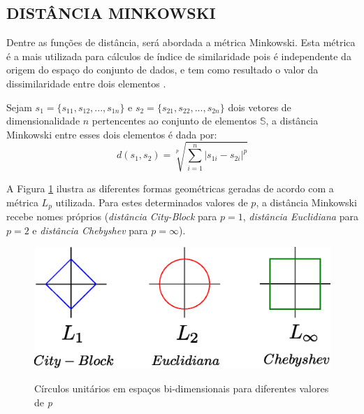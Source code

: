 \subsection{DISTÂNCIA MINKOWSKI}
Dentre as funções de distância, será abordada a métrica Minkowski. Esta métrica é a mais utilizada para cálculos de índice de similaridade
pois é independente da origem do espaço do conjunto de dados, e tem como resultado o valor da dissimilaridade entre dois elementos \cite{Jain1988}.
\begin{mydef}
\label{def:mink}
  Sejam $s_1 = \{s_{11},s_{12},...,s_{1n}\}$ e $s_2 = \{s_{21},s_{22},...,s_{2n}\}$ dois vetores de dimensionalidade $n$ pertencentes ao conjunto de
  elementos $\mathbb{S}$, a distância Minkowski entre esses dois elementos é dada por:
\begin{equation}
		d(s_1,s_2) = \sqrt[p]{\sum_{i=1}^{n}|s_{1i} - s_{2i}|^p}
\end{equation}
\end{mydef}

A Figura \ref{fig:minko} ilustra as diferentes formas geométricas geradas de acordo com a métrica $L_p$ utilizada. Para estes determinados valores de $p$, a distância Minkowski recebe nomes
próprios (\textit{distância City-Block} para $p = 1$, \textit{distância Euclidiana} para $p = 2$ e \textit{distância Chebyshev} para $p = \infty$).

\begin{figure}[H]
\centering
\caption{Círculos unitários em espaços bi-dimensionais para diferentes valores de \textit{p}}
\includegraphics[width=.7\textwidth]{dados/figuras/minko.eps}
\label{fig:minko}
\end{figure}

